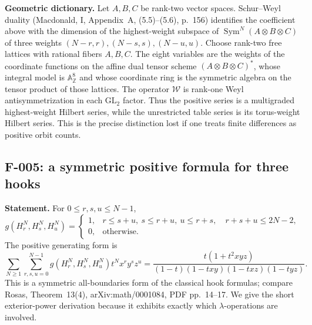 \textbf{Geometric dictionary.}
Let $A,B,C$ be rank-two vector spaces. Schur--Weyl duality (Macdonald, I, Appendix~A, (5.5)--(5.6), p.~156) identifies the
coefficient above with the dimension of the highest-weight subspace of
$\operatorname{Sym}^N(A\otimes B\otimes C)$ of three weights
$(N-r,r),(N-s,s),(N-u,u)$. Choose rank-two free lattices with rational fibers $A,B,C$. The eight
variables are the weights of the coordinate functions on the affine dual
tensor scheme $(A\otimes B\otimes C)^*$, whose integral model is
$\mathbb A^8_{\mathbb Z}$ and whose coordinate ring is the symmetric
algebra on the tensor product of those lattices. The operator $\mathcal W$ is
rank-one Weyl antisymmetrization in each $\mathrm{GL}_2$ factor. Thus the
positive series is a multigraded highest-weight Hilbert series, while the
unrestricted table series is its torus-weight Hilbert series. This is the
precise distinction lost if one treats finite differences as positive orbit
counts.

\subsection{F-005: a symmetric positive formula for three hooks}
\textbf{Statement.}
For $0\leq r,s,u\leq N-1$,
\[
 g(H_r^N,H_s^N,H_u^N)=
 \begin{cases}
 1,&r\leq s+u,\ s\leq r+u,\ u\leq r+s,\quad r+s+u\leq2N-2,\\
 0,&\text{otherwise}.
 \end{cases}                                         \tag{F-005.1}
\]
The positive generating form is
\[
 \sum_{N\geq1}\sum_{r,s,u=0}^{N-1}g(H_r^N,H_s^N,H_u^N)t^Nx^ry^sz^u
 =\frac{t(1+t^2xyz)}{(1-t)(1-txy)(1-txz)(1-tyz)}.      \tag{F-005.2}
\]
This is a symmetric all-boundaries form of the classical hook formulas;
compare Rosas, Theorem~13(4), arXiv:math/0001084, PDF pp.~14--17. We give the
short exterior-power derivation because it exhibits exactly which
$\lambda$-operations are involved.

